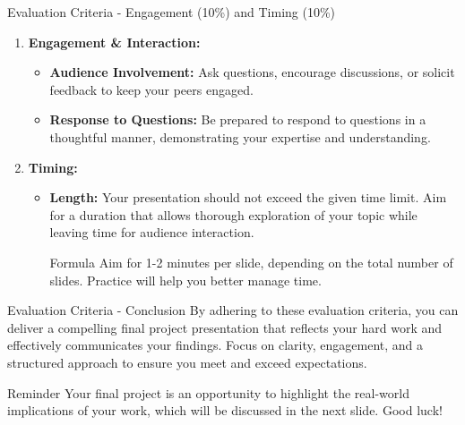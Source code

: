 \documentclass[aspectratio=169]{beamer}
\begin{document}
\begin{frame}[fragile]{Evaluation Criteria - Engagement (10\%) and Timing (10\%)}
    \begin{enumerate}
        \item \textbf{Engagement \& Interaction:}
        \begin{itemize}
            \item \textbf{Audience Involvement:} Ask questions, encourage discussions, or solicit feedback to keep your peers engaged.
            \item \textbf{Response to Questions:} Be prepared to respond to questions in a thoughtful manner, 
            demonstrating your expertise and understanding.
        \end{itemize}
        
        \item \textbf{Timing:}
        \begin{itemize}
            \item \textbf{Length:} Your presentation should not exceed the given time limit. 
            Aim for a duration that allows thorough exploration of your topic while leaving time for audience interaction.
            
            \begin{block}{Formula}
            Aim for 1-2 minutes per slide, depending on the total number of slides. 
            Practice will help you better manage time.
            \end{block}
        \end{itemize}
    \end{enumerate}
\end{frame}

\begin{frame}[fragile]{Evaluation Criteria - Conclusion}
    By adhering to these evaluation criteria, you can deliver a compelling final project presentation that 
    reflects your hard work and effectively communicates your findings. 
    Focus on clarity, engagement, and a structured approach to ensure you meet and exceed expectations.
    
    \begin{block}{Reminder}
    Your final project is an opportunity to highlight the real-world implications of your work, 
    which will be discussed in the next slide. Good luck!
    \end{block}
\end{frame}
\end{document}
